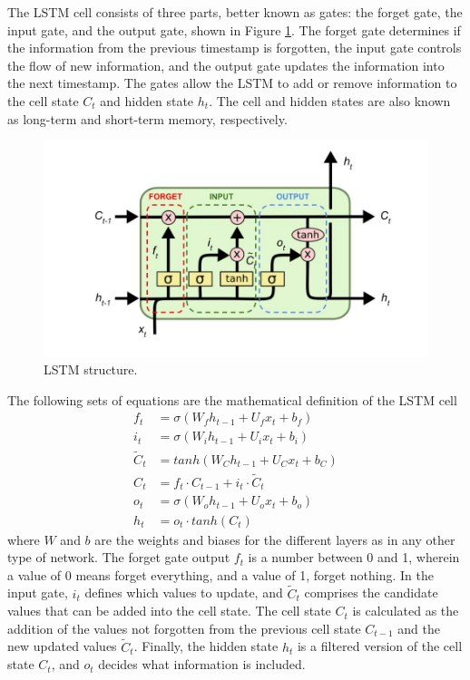 The LSTM cell consists of three parts, better known as gates: the forget gate, the input gate, and the output gate, shown in Figure \ref{fig:lstm}.
The forget gate determines if the information from the previous timestamp is forgotten, the input gate controls the flow of new information, and the output gate updates the information into the next timestamp.
The gates allow the LSTM to add or remove information to the cell state $C_t$ and hidden state $h_t$.
The cell and hidden states are also known as long-term and short-term memory, respectively.

\begin{figure}[htbp!] %
  \centering
  \includegraphics[width=0.5\linewidth]{figures/lstm}
  \caption{LSTM structure.}
  \label{fig:lstm}
\end{figure}

The following sets of equations are the mathematical definition of the LSTM cell
\begin{align}
f_t &= \sigma \left( W_f h_{t-1} + U_f x_t + b_f \right)  \label{eq:lstm1} \\
i_t &= \sigma \left( W_i h_{t-1} + U_i x_t + b_i \right)  \label{eq:lstm2} \\
\tilde{C}_t &= tanh \left( W_C h_{t-1} + U_C x_t + b_C \right)  \label{eq:lstm3} \\
C_t &= f_t \cdot C_{t-1} + i_t \cdot \tilde{C}_t          \label{eq:lstm3} \\
o_t &= \sigma \left( W_o h_{t-1} + U_o x_t + b_o \right)  \label{eq:lstm4} \\
h_t &= o_t \cdot tanh \left( C_t \right)                  \label{eq:lstm5}
\end{align}
where $W$ and $b$ are the weights and biases for the different layers as in any other type of network.
The forget gate output $f_t$ is a number between 0 and 1, wherein a value of 0 means forget everything, and a value of 1, forget nothing.
In the input gate, $i_t$ defines which values to update, and $\tilde{C}_t$ comprises the candidate values that can be added into the cell state.
The cell state $C_t$ is calculated as the addition of the values not forgotten from the previous cell state $C_{t-1}$ and the new updated values $\tilde{C}_t$.
Finally, the hidden state $h_t$ is a filtered version of the cell state $C_t$, and $o_t$ decides what information is included.


